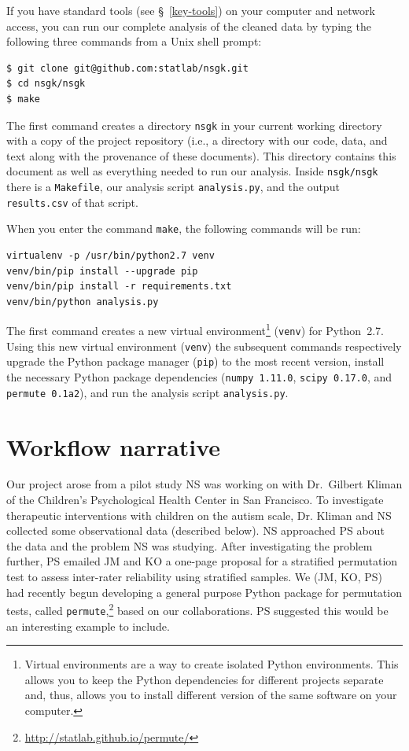 \documentclass[]{article}
\begin{document}
If you have standard tools (see \S~\ref{key-tools}) on your
computer and network access, you can run our complete analysis of the cleaned
data by typing the following three commands from a Unix shell prompt:
\begin{verbatim}
$ git clone git@github.com:statlab/nsgk.git
$ cd nsgk/nsgk
$ make
\end{verbatim}
The first command creates a directory \texttt{nsgk} in your current working
directory with a copy of the project repository (i.e., a directory with our
code, data, and text along with the provenance of these documents).
This directory contains this document as well as everything needed to run our
analysis.
Inside \texttt{nsgk/nsgk} there is a \texttt{Makefile}, our analysis script
\texttt{analysis.py}, and the output \texttt{results.csv} of that script.

When you enter the command \texttt{make}, the following commands will be run:
\begin{verbatim}
virtualenv -p /usr/bin/python2.7 venv
venv/bin/pip install --upgrade pip
venv/bin/pip install -r requirements.txt
venv/bin/python analysis.py
\end{verbatim}
The first command creates a new virtual environment\footnote{
Virtual environments are a way to create isolated Python environments.
This allows you to keep the Python dependencies for different
projects separate and, thus, allows you to install different
version of the same software on your computer.
}
(\texttt{venv}) for Python~2.7.
Using this new virtual environment (\texttt{venv}) the subsequent commands
respectively upgrade the Python package manager (\texttt{pip}) to the most
recent version, install the necessary Python package dependencies
(\texttt{numpy~1.11.0}, \texttt{scipy~0.17.0}, and \texttt{permute~0.1a2}),
and run the analysis script \texttt{analysis.py}.

\section{Workflow narrative}

Our project arose from a pilot study NS was working on with Dr.~Gilbert Kliman of
the Children's Psychological Health Center in San Francisco.
To investigate therapeutic interventions with children on the autism scale,
Dr. Kliman and NS collected some observational data (described below).
NS approached PS about the data and the problem NS was studying.
After investigating the problem further, PS emailed JM and KO a one-page
proposal for a stratified permutation test to assess inter-rater
reliability using stratified samples.
We (JM, KO, PS) had recently begun developing a general purpose Python package
for permutation tests, called
\texttt{permute},\footnote{\url{http://statlab.github.io/permute/}}
based on our collaborations.
PS suggested this would be an interesting example to include.
\end{document}
